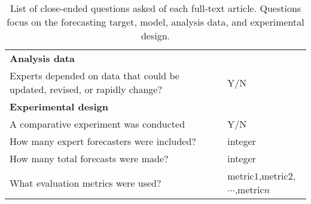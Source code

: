 \documentclass[preprint]{elsarticle}
\begin{document}
\begin{table*}[ht!]
\begin{tabular}{ll}
    \textbf{Analysis data}\\
    Experts depended on data that could be updated, revised, or rapidly change? & Y/N \\
    
    \textbf{Experimental design}\\
    A comparative experiment was conducted               & Y/N\\
    How many expert forecasters were included?           & integer\\
    How many total forecasts were made?                  & integer\\
    What evaluation metrics were used?                   & metric$1$,metric$2$,$\cdots$,metric$n$\\

    \hline
  \end{tabular}
  \caption{ List of close-ended questions asked of each full-text article. Questions focus on the forecasting target, model, analysis data, and experimental design.\label{tab.prespecList}}
\end{table*}
\end{document}
